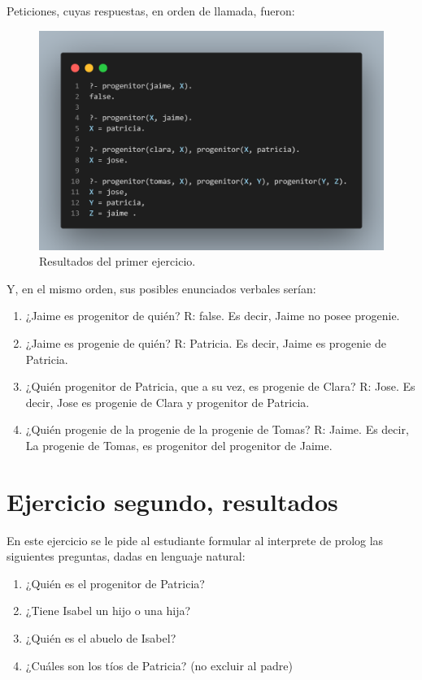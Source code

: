 \documentclass{article}
\begin{document}
Peticiones, cuyas respuestas, en orden de llamada, fueron:
\begin{figure}[h]
    \centering
    \includegraphics[width=1\textwidth]{./img/results.png}
    \caption{Resultados del primer ejercicio.}
    \label{fig:results_1}
\end{figure}

Y, en el mismo orden, sus posibles enunciados verbales serían:
\begin{enumerate}
    \item ¿Jaime es progenitor de quién? R: false. Es decir, Jaime no posee progenie.
    \item ¿Jaime es progenie de quién? R: Patricia. Es decir, Jaime es progenie de Patricia.
    \item ¿Quién progenitor de Patricia, que a su vez, es progenie de Clara? R: Jose. Es decir, Jose es progenie de Clara y progenitor de Patricia.
    \item ¿Quién progenie de la progenie de la progenie de Tomas? R: Jaime. Es decir, La progenie de Tomas, es progenitor del progenitor de Jaime. 
\end{enumerate}


\section*{Ejercicio segundo, resultados}
En este ejercicio se le pide al estudiante formular al interprete de prolog las siguientes preguntas, dadas en lenguaje natural:
\begin{enumerate}
    \item ¿Quién es el progenitor de Patricia?
    \item ¿Tiene Isabel un hijo o una hija?
    \item ¿Quién es el abuelo de Isabel?
    \item ¿Cuáles son los tíos de Patricia? (no excluir al padre)
\end{enumerate}
\end{document}
